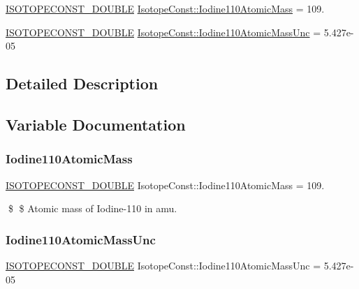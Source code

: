 \begin{DoxyCompactItemize}
\item 
\mbox{\hyperlink{group___isotope_const-_macros_ga8f45a7272ce02c0b4c65c44636ed719a}{I\+S\+O\+T\+O\+P\+E\+C\+O\+N\+S\+T\+\_\+\+D\+O\+U\+B\+LE}} \mbox{\hyperlink{group___isotope_const-_iodine-_i110_gae5ba053c2f87a0ecc28180c8a98564f1}{Isotope\+Const\+::\+Iodine110\+Atomic\+Mass}} = 109.
\item 
\mbox{\hyperlink{group___isotope_const-_macros_ga8f45a7272ce02c0b4c65c44636ed719a}{I\+S\+O\+T\+O\+P\+E\+C\+O\+N\+S\+T\+\_\+\+D\+O\+U\+B\+LE}} \mbox{\hyperlink{group___isotope_const-_iodine-_i110_ga7075f9edcad25ce828ea5fa50e4cbe8c}{Isotope\+Const\+::\+Iodine110\+Atomic\+Mass\+Unc}} = 5.\+427e-\/05
\end{DoxyCompactItemize}


\subsection{Detailed Description}


\subsection{Variable Documentation}
\mbox{\label{group___isotope_const-_iodine-_i110_gae5ba053c2f87a0ecc28180c8a98564f1}} 
\subsubsection{\texorpdfstring{Iodine110\+Atomic\+Mass}{Iodine110AtomicMass}}
{\footnotesize\ttfamily \mbox{\hyperlink{group___isotope_const-_macros_ga8f45a7272ce02c0b4c65c44636ed719a}{I\+S\+O\+T\+O\+P\+E\+C\+O\+N\+S\+T\+\_\+\+D\+O\+U\+B\+LE}} Isotope\+Const\+::\+Iodine110\+Atomic\+Mass = 109.}

\$ \$ Atomic mass of Iodine-\/110 in amu. \mbox{\label{group___isotope_const-_iodine-_i110_ga7075f9edcad25ce828ea5fa50e4cbe8c}} 
\subsubsection{\texorpdfstring{Iodine110\+Atomic\+Mass\+Unc}{Iodine110AtomicMassUnc}}
{\footnotesize\ttfamily \mbox{\hyperlink{group___isotope_const-_macros_ga8f45a7272ce02c0b4c65c44636ed719a}{I\+S\+O\+T\+O\+P\+E\+C\+O\+N\+S\+T\+\_\+\+D\+O\+U\+B\+LE}} Isotope\+Const\+::\+Iodine110\+Atomic\+Mass\+Unc = 5.\+427e-\/05}

